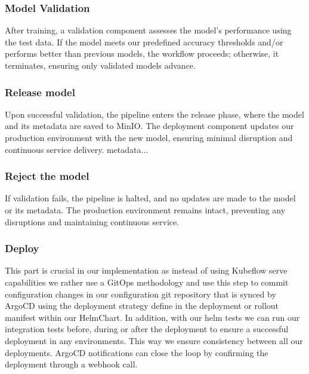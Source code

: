 \subsubsection{Model Validation}
After training, a validation component assesses the model's performance using the test data.
If the model meets our predefined accuracy thresholds and/or performs better than previous models,
the workflow proceeds; otherwise, it terminates, ensuring only validated models advance.

\subsubsection{Release model}
Upon successful validation, the pipeline enters the release phase, where the model and its metadata are saved to MinIO.
The deployment component updates our production environment with the new model, ensuring minimal disruption and continuous service delivery.
metadata...

\subsubsection{Reject the model}
If validation fails, the pipeline is halted, and no updates are made to the model or its metadata.
The production environment remains intact, preventing any disruptions and maintaining continuous service.


\subsubsection{Deploy}
This part is crucial in our implementation as instead of using Kubeflow serve capabilities we rather use a GitOps methodology
and use this step to commit configuration changes in our configuration git repository that is synced by ArgoCD
using the deployment strategy define in the deployment or rollout manifest within our HelmChart.
In addition, with our helm tests we can run our integration tests before,
during or after the deployment to ensure a successful deployment in any environments.
This way we ensure consistency between all our deployments. %
ArgoCD notifications can close the loop by confirming the deployment through a webhook call.
